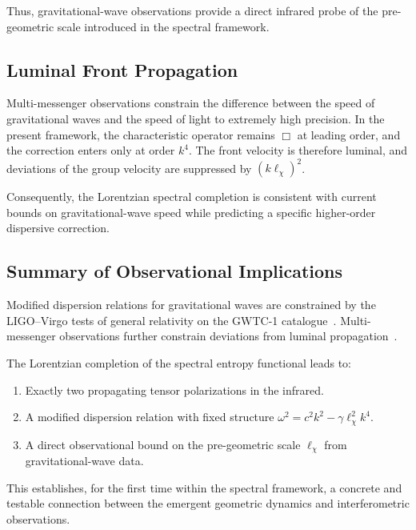     Thus, gravitational-wave observations provide a direct infrared probe
    of the pre-geometric scale introduced in the spectral framework.

  \subsection{Luminal Front Propagation}
    \label{subsec:luminal-front-propagation}

    Multi-messenger observations constrain the difference between the
    speed of gravitational waves and the speed of light to extremely high precision.
    In the present framework, the characteristic operator remains
    $\Box$ at leading order, and the correction enters only at order $k^4$.
    The front velocity is therefore luminal, and deviations of the group
    velocity are suppressed by $(k\ell_\chi)^2$.

    Consequently, the Lorentzian spectral completion is consistent with
    current bounds on gravitational-wave speed while predicting a specific
    higher-order dispersive correction.

  \subsection{Summary of Observational Implications}
    \label{subsec:summary-of-observational-implications}

    Modified dispersion relations for gravitational waves are
    constrained by the LIGO--Virgo tests of general relativity on the
    GWTC-1 catalogue~\cite{LIGO2019Dispersion}.
    Multi-messenger observations further constrain deviations from
    luminal propagation~\cite{LIGO2017Speed}.

    The Lorentzian completion of the spectral entropy functional leads to:

    \begin{enumerate}
      \item Exactly two propagating tensor polarizations in the infrared.
      \item A modified dispersion relation with fixed structure $\omega^2 = c^2 k^2 - \gamma \ell_\chi^2 k^4$.
      \item A direct observational bound on the pre-geometric scale
      $\ell_\chi$ from gravitational-wave data.
    \end{enumerate}

    This establishes, for the first time within the spectral framework,
    a concrete and testable connection between the emergent geometric dynamics and interferometric observations.

